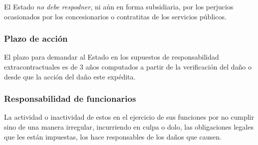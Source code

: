 \documentclass[../resumen.tex]{subfiles}
\begin{document}
El Estado \textit{no debe respodner}, ni aún en forma subsidiaria, por los 
perjucios ocasionados por los concesionarios o contratitas de los servicios
públicos.

\subsubsection{Plazo de acción}

El plazo para demandar al Estado en los supuestos de responsabilidad
extracontractuales es de 3 años computados a partir de la verificación del daño
o desde que la acción del daño este expédita.

\subsubsection{Responsabilidad de funcionarios}

La actividad o inactividad de estos en el ejercicio de sus funciones por no
cumplir sino de una manera irregular, incurriendo en culpa o dolo, las obligaciones
legales que les están impuestas, los hace responsables de los daños que causen.
\end{document}
